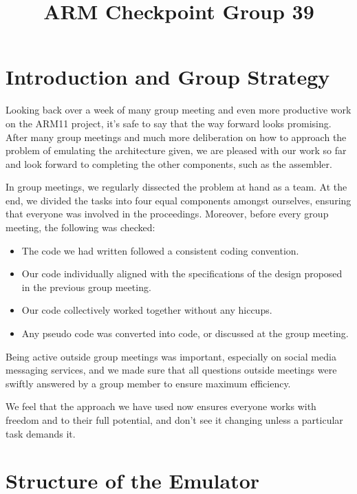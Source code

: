 \documentclass[11pt]{article}
\begin{document}
\title{ARM Checkpoint Group 39}

\maketitle

\section{Introduction and Group Strategy}

Looking back over a week of many group meeting and even more productive work on the ARM11 project, it’s safe to say that the way forward looks promising. After many group meetings and much more deliberation on how to approach the problem of emulating the architecture given, we are pleased with our work so far and look forward to completing the other components, such as the assembler.

In group meetings, we regularly dissected the problem at hand as a team. At the end, we divided the tasks into four equal components amongst ourselves, ensuring that everyone was involved in the proceedings. Moreover, before every group meeting, the following was checked:

\begin{itemize}

    \item The code we had written followed a consistent coding convention.
    \item Our code individually aligned with the specifications of the design proposed in the previous group meeting.
    \item Our code collectively worked together without any hiccups.
    \item Any pseudo code was converted into code, or discussed at the group meeting.

\end{itemize}

Being active outside group meetings was important, especially on social media messaging services, and we made sure that all questions outside meetings were swiftly answered by a group member to ensure maximum efficiency. 

We feel that the approach we have used now ensures everyone works with freedom and to their full potential, and don’t see it changing unless a particular task demands it.

\section{Structure of the Emulator}
\end{document}
